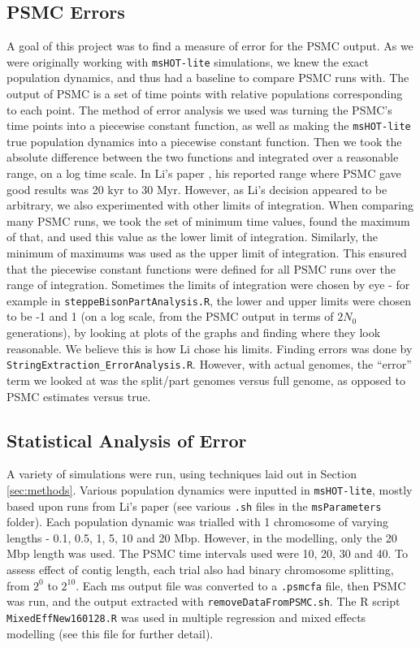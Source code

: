 \documentclass[11pt,a4paper]{article}
\begin{document}
\subsection{PSMC Errors}
A goal of this project was to find a measure of error for the PSMC output. As we were originally working with \verb|msHOT-lite| simulations, we knew the exact population dynamics, and thus had a baseline to compare PSMC runs with. The output of PSMC is a set of time points with relative populations corresponding to each point. The method of error analysis we used was turning the PSMC's time points into a piecewise constant function, as well as making the \verb|msHOT-lite| true population dynamics into a piecewise constant function. Then we took the absolute difference between the two functions and integrated over a reasonable range, on a log time scale. In Li's paper \cite{li2011inference}, his reported range where PSMC gave good results was 20 kyr to 30 Myr. However, as Li's decision appeared to be arbitrary, we also experimented with other limits of integration. When comparing many PSMC runs, we took the set of minimum time values, found the maximum of that, and used this value as the lower limit of integration. Similarly, the minimum of maximums was used as the upper limit of integration. This ensured that the piecewise constant functions were defined for all PSMC runs over the range of integration. Sometimes the limits of integration were chosen by eye - for example in \verb|steppeBisonPartAnalysis.R|, the lower and upper limits were chosen to be -1 and 1 (on a log scale, from the PSMC output in terms of $2N_0$ generations), by looking at plots of the graphs and finding where they look reasonable. We believe this is how Li chose his limits. Finding errors was done by \verb|StringExtraction_ErrorAnalysis.R|. However, with actual genomes, the ``error'' term we looked at was the split/part genomes versus full genome, as opposed to PSMC estimates versus true.

\subsection{Statistical Analysis of Error}
A variety of simulations were run, using techniques laid out in Section \ref{sec:methods}. Various population dynamics were inputted in \verb|msHOT-lite|, mostly based upon runs from Li's paper \cite{li2011inference} (see various \verb|.sh| files in the \verb|msParameters| folder). Each population dynamic was trialled with 1 chromosome of varying lengths - 0.1, 0.5, 1, 5, 10 and 20 Mbp. However, in the modelling, only the 20 Mbp length was used. The PSMC time intervals used were 10, 20, 30 and 40. To assess effect of contig length, each trial also had binary chromosome splitting, from $2^0$ to $2^{10}$. Each ms output file was converted to a \verb|.psmcfa| file, then PSMC was run, and the output extracted with \verb|removeDataFromPSMC.sh|. The R script \verb|MixedEffNew160128.R| was used in multiple regression and mixed effects modelling (see this file for further detail).
\end{document}
